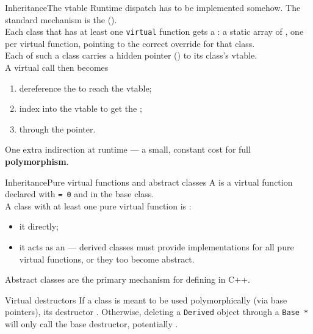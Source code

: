 \begin{frame}{Inheritance}{The vtable}
	\justifying
	Runtime dispatch has to be implemented somehow. The standard mechanism is the  ().\\
	\bigskip
	Each class that has at least one \texttt{virtual} function gets a : a static array of , one per virtual function, pointing to the correct override for that class.\\
	\bigskip
	Each  of such a class carries a hidden pointer () to its class's vtable.\\
	\bigskip
	A virtual call then becomes
	\begin{enumerate}
		\item dereference the  to reach the vtable;
		\item index into the vtable to get the ;
		\item {} through the pointer.
	\end{enumerate}
	\bigskip
	\begin{block}{}
		\centering
		One extra indirection at runtime — a small, constant cost for full \textbf{polymorphism}.
	\end{block}
\end{frame}
\begin{frame}{Inheritance}{Pure virtual functions and abstract classes}
	\justifying
	A  is a virtual function declared with \texttt{= 0} and  in the base class.\\
	\bigskip
	A class with at least one pure virtual function is :
	\begin{itemize}
		\item it  directly;
		\item it acts as an  — derived classes must provide implementations for all pure virtual functions, or they too become abstract.
	\end{itemize}
	\bigskip
	Abstract classes are the primary mechanism for defining  in C++.\\
	\bigskip
	\begin{alertblock}{Virtual destructors}
		\justifying
		If a class is meant to be used polymorphically (via base pointers), its destructor .
		Otherwise, deleting a \texttt{Derived} object through a \texttt{Base *} will only call the base destructor, potentially .
	\end{alertblock}
\end{frame}
